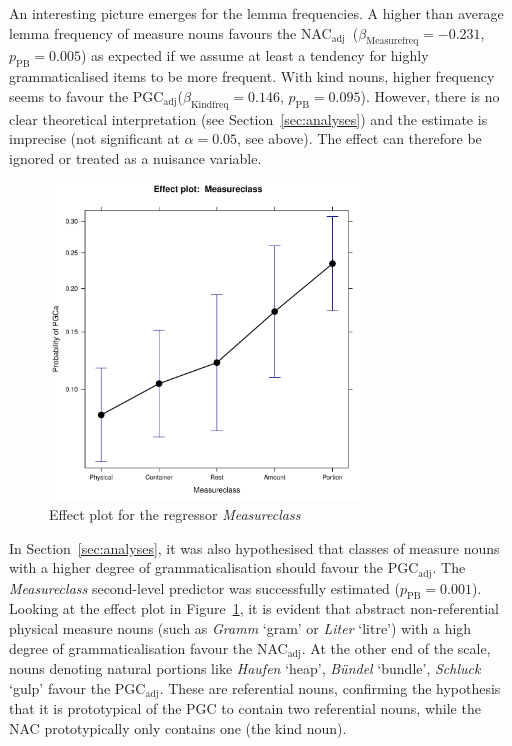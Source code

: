 \documentclass[USenglish]{article}
\newcommand{\Sub}[1]{\ensuremath{\mathrm{_{#1}}}}
\newcommand{\mpPB}{\ensuremath{p_{\text{PB}}}}
\newcommand{\NACa}{NAC\Sub{adj}}
\newcommand{\PGCa}{PGC\Sub{adj}}
\begin{document}
An interesting picture emerges for the lemma frequencies.
A higher than average lemma frequency of measure nouns favours the \NACa\ ($\beta_{\text{Measurefreq}}=-0.231$, $\mpPB=0.005$) as expected if we assume at least a tendency for highly grammaticalised items to be more frequent.
With kind nouns, higher frequency seems to favour the \PGCa ($\beta_{\text{Kindfreq}}=0.146$, $\mpPB=0.095$).
However, there is no clear theoretical interpretation (see Section~\ref{sec:analyses}) and the estimate is imprecise (not significant at $\alpha=0.05$, see above).
The effect can therefore be ignored or treated as a nuisance variable.



\begin{figure}[h!]
  \centering
  \includegraphics[width=0.75\textwidth]{../R/output/corpus_Measureclass}
  \caption{Effect plot for the regressor \textit{Measureclass}}
  \label{fig:eff:measureattraction}
\end{figure}

In Section~\ref{sec:analyses}, it was also hypothesised that classes of measure nouns with a higher degree of grammaticalisation should favour the \PGCa.
The \textit{Measureclass} second-level predictor was successfully estimated ($\mpPB=0.001$).
Looking at the effect plot in Figure~\ref{fig:eff:measureattraction}, it is evident that abstract non-referential physical measure nouns (such as \textit{Gramm} `gram' or \textit{Liter} `litre') with a high degree of grammaticalisation favour the \NACa.
At the other end of the scale, nouns denoting natural portions like \textit{Haufen} `heap', \textit{Bündel} `bundle', \textit{Schluck} `gulp' favour the \PGCa.
These are referential nouns, confirming the hypothesis that it is prototypical of the PGC to contain two referential nouns, while the NAC prototypically only contains one (the kind noun).
\end{document}
